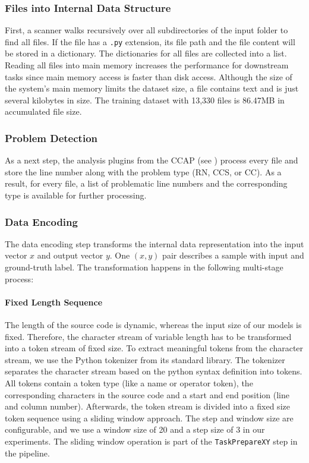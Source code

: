 \subsubsection{Files into Internal Data Structure}
First, a scanner walks recursively over all subdirectories of the input folder to find all files. If the file has a \texttt{.py} extension, its file path and the file content will be stored in a dictionary. The dictionaries for all files are collected into a list. 
Reading all files into main memory increases the performance for downstream tasks since main memory access is faster than disk access. Although the size of the system's main memory limits the dataset size, a file contains text and is just several kilobytes in size. The training dataset with 13,330 files is 86.47MB in accumulated file size.

\subsubsection{Problem Detection}\label{sec:problem_detection}
As a next step, the analysis plugins from the CCAP (see ) process every file and store the line number along with the problem type (RN, CCS, or CC). As a result, for every file, a list of problematic line numbers and the corresponding type is available for further processing. 

\subsubsection{Data Encoding}\label{sec:data_encoding}
The data encoding step transforms the internal data representation into the input vector $x$ and output vector $y$. One $(x,y)$ pair describes a sample with input and ground-truth label. The transformation happens in the following multi-stage process:
\paragraph{Fixed Length Sequence}
The length of the source code is dynamic, whereas the input size of our models is fixed. Therefore, the character stream of variable length has to be transformed into a token stream of fixed size. 
To extract meaningful tokens from the character stream, we use the Python tokenizer from its standard library. The tokenizer separates the character stream based on the python syntax definition into tokens. All tokens contain a token type (like a name or operator token), the corresponding characters in the source code and a start and end position (line and column number). Afterwards, the token stream is divided into a fixed size token sequence using a sliding window approach. The step and window size are configurable, and we use a window size of 20 and a step size of 3 in our experiments. The sliding window operation is part of the \texttt{TaskPrepareXY} step in the pipeline.
